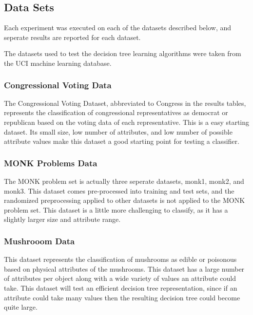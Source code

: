 \documentclass[12pt, letterpaper]{article}
\begin{document}

\subsection*{Data Sets}
Each experiment was executed on each of the datasets described below, and seperate results
are reported for each dataset.

The datasets used to test the decision tree learning algorithms were taken from the UCI machine
learning database\cite{datasets}.  

\subsubsection*{Congressional Voting Data}
The Congressional Voting Dataset, abbreviated to Congress in the results tables, represents
the classification of congressional representatives as democrat or republican based on the
voting data of each representative.  This is a easy starting dataset.  Its small size, low number
of attributes, and low number of possible attribute values make this dataset a good starting point for
testing a classifier.

\subsubsection*{MONK Problems Data}
The MONK problem set is actually three seperate datasets, monk1, monk2, and monk3.  
This dataset comes pre-processed into 
training and test sets, and the randomized preprocessing applied to other datasets is not 
applied to the MONK problem set.  This dataset is a little more challenging to classify, as it has 
a slightly larger size and attribute range.  

\subsubsection*{Mushrooom Data}
This dataset represents the classification of mushrooms as edible or poisonous based on 
physical attributes of the mushrooms.  This dataset has a large number of attributes per object along with
a wide variety of values an attribute could take.  This dataset will test an efficient decision tree
representation, since if an attribute could take many values then the resulting decision tree could become
quite large.
\end{document}
